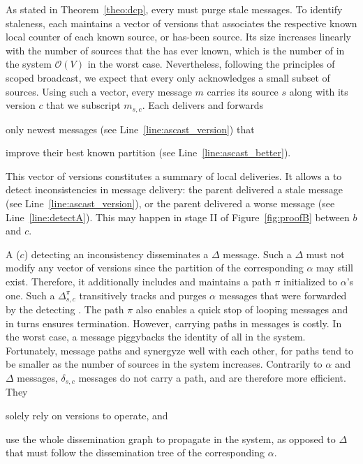 As stated in Theorem~\ref{theo:dcp}, every \process must purge stale
messages.  To identify staleness, each \process maintains a vector of
versions that associates the respective known local counter of each
known source, or has-been source. Its size increases linearly with the
number of sources that the \process has ever known, which is the
number of \processes in the system $\mathcal{O}(V)$ in the worst case.
Nevertheless, following the principles of scoped broadcast, we expect
that every \process only acknowledges a small subset of sources.
Using such a vector, every message $m$ carries its source $s$ along
with its version $c$ that we subscript $m_{s, c}$.  Each \process
delivers and forwards
\begin{inparaenum}[(i)]
\item only newest messages (see Line~\ref{line:ascast_version}) that
\item improve their best known partition (see
  Line~\ref{line:ascast_better}).
\end{inparaenum}
This vector of versions constitutes a summary of local deliveries. It
allows a \process to detect inconsistencies in message delivery: the
parent delivered a stale message (see Line~\ref{line:ascast_version}),
or the parent delivered a worse message (see
Line~\ref{line:detectA}). This may happen in stage II of
Figure~\ref{fig:proofB} between $b$ and $c$.

A \process ($c$) detecting an inconsistency disseminates a $\Delta$
message. Such a $\Delta$ must not modify any vector of versions since
the partition of the corresponding $\alpha$ may still exist.
Therefore, it additionally includes and maintains a path $\pi$
initialized to $\alpha$'s one. Such a $\Delta_{s, c}^{\pi}$
transitively tracks and purges $\alpha$ messages that were forwarded
by the detecting \process. The path $\pi$ also enables a quick stop of
looping messages and in turns ensures termination. However, carrying
paths in messages is costly. In the worst case, a message piggybacks
the identity of all \processes in the system. Fortunately, message
paths and \NAME synergyze well with each other, for paths tend to be
smaller as the number of sources in the system increases. Contrarily
to $\alpha$ and $\Delta$ messages, $\delta_{s, c}$ messages do not
carry a path, and are therefore more efficient. They
\begin{inparaenum}[(i)]
\item solely rely on versions to operate, and
\item use the whole dissemination graph to propagate in the system, as
  opposed to $\Delta$ that must follow the dissemination tree of the
  corresponding $\alpha$.
\end{inparaenum}


